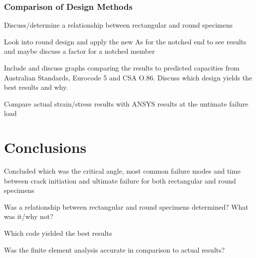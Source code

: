 \documentclass[11pt,a4paper]{article}
\numberwithin{equation}{subsection}
\begin{document}
\subsubsection{Comparison of Design Methods}


\vspace*{\baselineskip}
\noindent Discuss/determine a relationship between rectangular and round specimens\par

\vspace*{\baselineskip}
\noindent Look into round design and apply the new As for the notched end to see results and maybe discuss a factor for a notched member\par

\vspace*{\baselineskip}
\noindent Include and discuss graphs comparing the results to predicted capacities from Australian Standards, Eurocode 5 and CSA O.86. Discuss which design yields the best results and why. \par

\vspace*{\baselineskip}
\noindent Compare actual strain/stress results with ANSYS results at the untimate failure load\par

\pagebreak	

\section{Conclusions}
\vspace*{\baselineskip}
\noindent Concluded which was the critical angle, most common failure modes and time between crack initiation and ultimate failure for both rectangular and round specimens\par

\vspace*{\baselineskip}
\noindent Was a relationship between rectangular and round specimens determined? What was it/why not?\par

\vspace*{\baselineskip}
\noindent Which code yielded the best results\par

\vspace*{\baselineskip}
\noindent Was the finite element analysis accurate in comparison to actual results?\par

\pagebreak	
\end{document}
